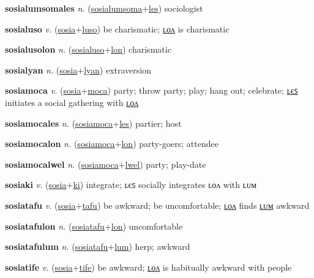 \textbf{\hypertarget{sosialumsomales}{sosialumsomales}} \textit{n.} (\hyperlink{sosialumsoma}{sosialumsoma}+\allowbreak \hyperlink{les}{les})
sociologist

\textbf{\hypertarget{sosialuso}{sosialuso}} \textit{v.} (\hyperlink{sosia}{sosia}+\allowbreak \hyperlink{luso}{luso})
be charismatic; \hyperlink{sosialusolon}{ʟᴏᴧ} is charismatic

\textbf{\hypertarget{sosialusolon}{sosialusolon}} \textit{n.} (\hyperlink{sosialuso}{sosialuso}+\allowbreak \hyperlink{lon}{lon})
charismatic

\textbf{\hypertarget{sosialyan}{sosialyan}} \textit{n.} (\hyperlink{sosia}{sosia}+\allowbreak \hyperlink{lyan}{lyan})
extraversion

\textbf{\hypertarget{sosiamoca}{sosiamoca}} \textit{v.} (\hyperlink{sosia}{sosia}+\allowbreak \hyperlink{moca}{moca})
party; throw party; play; hang out; celebrate; \hyperlink{sosiamocales}{ʟєꜱ} initiates a social gathering with \hyperlink{sosiamocalon}{ʟᴏᴧ}

\textbf{\hypertarget{sosiamocales}{sosiamocales}} \textit{n.} (\hyperlink{sosiamoca}{sosiamoca}+\allowbreak \hyperlink{les}{les})
partier; host

\textbf{\hypertarget{sosiamocalon}{sosiamocalon}} \textit{n.} (\hyperlink{sosiamoca}{sosiamoca}+\allowbreak \hyperlink{lon}{lon})
party-goers; attendee

\textbf{\hypertarget{sosiamocalwel}{sosiamocalwel}} \textit{n.} (\hyperlink{sosiamoca}{sosiamoca}+\allowbreak \hyperlink{lwel}{lwel})
party; play-date

\textbf{\hypertarget{sosiaki}{sosiaki}} \textit{v.} (\hyperlink{sosia}{sosia}+\allowbreak \hyperlink{ki}{ki})
integrate; ʟєꜱ socially integrates ʟᴏᴧ with ʟᴜᴍ

\textbf{\hypertarget{sosiatafu}{sosiatafu}} \textit{v.} (\hyperlink{sosia}{sosia}+\allowbreak \hyperlink{tafu}{tafu})
be awkward; be uncomfortable; \hyperlink{sosiatafulon}{ʟᴏᴧ} finds \hyperlink{sosiatafulum}{ʟᴜᴍ} awkward

\textbf{\hypertarget{sosiatafulon}{sosiatafulon}} \textit{n.} (\hyperlink{sosiatafu}{sosiatafu}+\allowbreak \hyperlink{lon}{lon})
uncomfortable

\textbf{\hypertarget{sosiatafulum}{sosiatafulum}} \textit{n.} (\hyperlink{sosiatafu}{sosiatafu}+\allowbreak \hyperlink{lum}{lum})
herp; awkward

\textbf{\hypertarget{sosiatife}{sosiatife}} \textit{v.} (\hyperlink{sosia}{sosia}+\allowbreak \hyperlink{tife}{tife})
be awkward; \hyperlink{sosiatifelon}{ʟᴏᴧ} is habitually awkward with people

